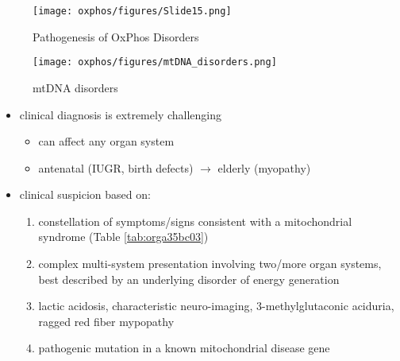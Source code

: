 \documentclass{scrartcl}
\begin{document}
\begin{figure}[htbp]
\centering
\texttt{[image: oxphos/figures/Slide15.png]}
\caption[ETC]{\label{fig:orgf3aa0bd}Pathogenesis of OxPhos Disorders}
\end{figure}


\begin{figure}[htbp]
\centering
\texttt{[image: oxphos/figures/mtDNA\_disorders.png]}
\caption{\label{fig:org935778d}mtDNA disorders}
\end{figure}

\begin{itemize}
\item clinical diagnosis is extremely challenging
\begin{itemize}
\item can affect any organ system
\item antenatal (IUGR, birth defects) \(\to\) elderly (myopathy)
\end{itemize}

\item clinical suspicion based on:
\begin{enumerate}
\item constellation of symptoms/signs consistent with a mitochondrial syndrome (Table \ref{tab:orga35bc03})
\item complex multi-system presentation involving two/more organ systems,
best described by an underlying disorder of energy generation
\item lactic acidosis, characteristic neuro-imaging, 3-methylglutaconic
aciduria, ragged red fiber mypopathy
\item pathogenic mutation in a known mitochondrial disease gene
\end{enumerate}
\end{itemize}
\end{document}
